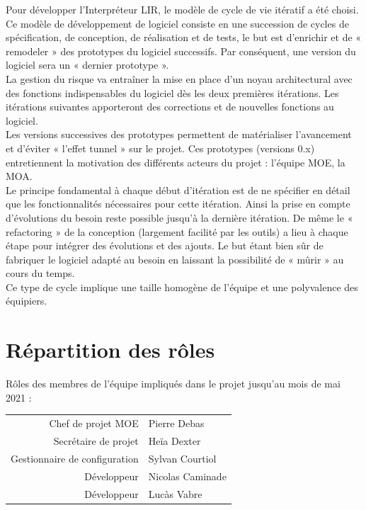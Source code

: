 \documentclass[11pt,a4paper,titlepage,openright]{report}
\begin{document}
    Pour développer l’Interpréteur LIR, le modèle de cycle de vie itératif a été choisi. Ce modèle de développement de logiciel consiste en une succession de cycles de spécification, de conception, de réalisation et de tests, le but est d’enrichir et de « remodeler » des prototypes du logiciel successifs. Par conséquent, une version du logiciel sera un « dernier prototype ».
    \\La gestion du risque va entraîner la mise en place d’un noyau architectural avec des fonctions indispensables du logiciel dès les deux premières itérations. Les itérations suivantes apporteront des corrections et de nouvelles fonctions au logiciel.
    \\Les versions successives des prototypes permettent de matérialiser l’avancement et d’éviter « l’effet tunnel » sur le projet. Ces prototypes (versions 0.x) entretiennent la motivation des différents acteurs du projet : l’équipe MOE, la MOA.
    \\Le principe fondamental à chaque début d’itération est de ne spécifier en détail que les fonctionnalités nécessaires pour cette itération. Ainsi la prise en compte d’évolutions du besoin reste possible jusqu’à la dernière itération. De même le « refactoring » de la conception (largement facilité par les outils) a lieu à chaque étape pour intégrer des évolutions et des ajouts. Le but étant bien sûr de fabriquer le logiciel adapté au besoin en laissant la possibilité de « mûrir » au cours du temps.
    \\Ce type de cycle implique une taille homogène de l’équipe et une polyvalence des équipiers.

    \section{Répartition des rôles}
    Rôles des membres de l’équipe impliqués dans le projet jusqu'au mois de mai 2021 :
    \begin{center}
        \begin{tabular}{rl}
            Chef de projet MOE            & Pierre Debas      \\
            Secrétaire de projet          & Heïa Dexter       \\
            Gestionnaire de configuration & Sylvan Courtiol   \\
            Développeur                   & Nicolas Caminade  \\
            Développeur                   & Lucàs Vabre       \\
        \end{tabular}
    \end{center}
\end{document}
